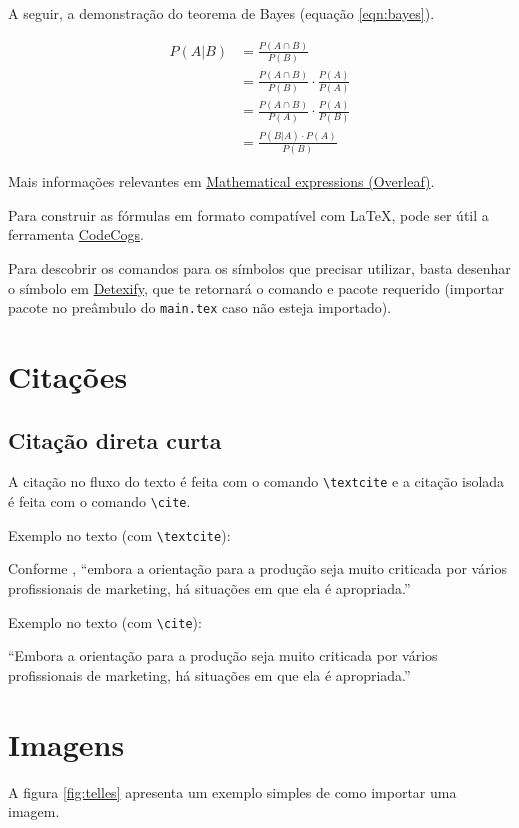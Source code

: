 A seguir, a demonstração do teorema de Bayes (equação \ref{eqn:bayes}).

\begin{align}
    P(A|B) &= \frac{P(A \cap B)}{P(B)}\\
    &= \frac{P(A \cap B)}{P(B)} \cdot \frac{P(A)}{P(A)}\\
    &= \frac{P(A \cap B)}{P(A)} \cdot \frac{P(A)}{P(B)}\\
    &= \frac{P(B|A) \cdot P(A)}{P(B)}\label{eqn:bayes}
\end{align}

Mais informações relevantes em \href{https://www.overleaf.com/learn/latex/Mathematical_expressions}{Mathematical expressions (Overleaf)}.

Para construir as fórmulas em formato compatível com \LaTeX, pode ser útil a ferramenta \href{https://editor.codecogs.com/}{CodeCogs}.

Para descobrir os comandos para os símbolos que precisar utilizar, basta desenhar o símbolo em \href{https://detexify.kirelabs.org/classify.html}{Detexify}, que te retornará o comando e pacote requerido (importar pacote no preâmbulo do \texttt{main.tex} caso não esteja importado).

\section{Citações}

\subsection{Citação direta curta}

A citação no fluxo do texto é feita com o comando \texttt{\textbackslash textcite} e a citação isolada é feita com o comando \texttt{\textbackslash cite}.

Exemplo no texto (com \texttt{\textbackslash textcite}):

Conforme \textcite[8]{churchill2012marketing}, “embora a orientação para a produção seja muito criticada por vários profissionais de marketing, há situações em que ela é apropriada.”

Exemplo no texto (com \texttt{\textbackslash cite}):

“Embora a orientação para a produção seja muito criticada por vários profissionais de marketing, há situações em que ela é apropriada.” \cite[8]{churchill2012marketing}

\section{Imagens}
A figura \ref{fig:telles} apresenta um exemplo simples de como importar uma imagem.

